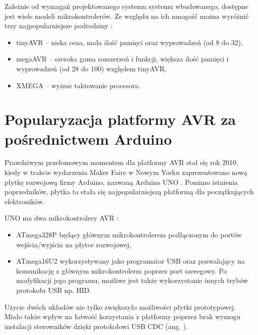 Zależnie od wymagań projektowanego systemu systemu wbudowanego, dostępne jest wiele modeli mikrokontrolerów. Ze względu na ich mnogość można wyróżnić trzy najpopularniejsze podrodziny :
\begin{itemize}
\item tinyAVR -- niska cena, mała ilość pamięci oraz wyprowadzeń (od 8 do 32),
\item megaAVR -- szeroka gama rozszerzeń i funkcji, większa ilość pamięci i wyprowadzeń (od 28 do 100) względem tinyAVR,
\item XMEGA -- wyższe taktowanie procesora.
\end{itemize}

\section{Popularyzacja platformy AVR za pośrednictwem Arduino}

Prawdziwym przełomowym momentem dla platformy AVR stał się rok 2010, kiedy w trakcie wydarzenia Maker Faire w Nowym Yorku zaprezentowano nową płytkę rozwojową firmy Arduino, nazwaną Arduino UNO . Pomimo istnienia poprzedników, płytka ta stała się najpopularniejszą platformą dla początkujących elektroników. 

UNO ma dwa mikrokontrolery AVR :
\begin{itemize}
\item ATmega328P będący głównym mikrokontrolerem podłączonym do portów wejścia/wyjścia na płytce rozwojowej,
\item ATmega16U2 wykorzystywany jako programator USB oraz pozwalający na komunikację z głównym mikrokontrolerm poprzez port szeregowy. Po modyfikacji jego programu, możliwe jest także wykorzystanie innych trybów protokołu USB np. HID.
\end{itemize}
Użycie dwóch układów nie tylko zwiększyło możliwości płytki prototypowej. Miało także wpływ na łatwość korzystania z platformy poprzez brak wymogu instalacji sterowników dzięki protokołowi USB CDC (ang. ).

